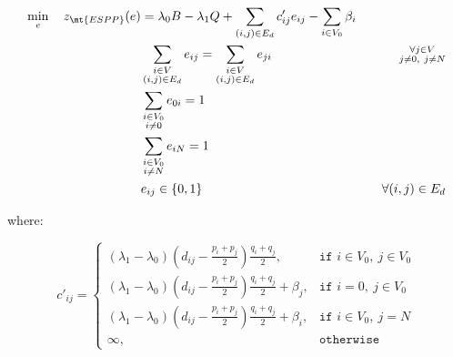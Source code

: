 \begin{align}
	\min_{e} \quad z_\mt{ESPP}(e) & = \lambda_0 B - \lambda_1 Q + \sum_{(i, j) \in E_d}  c'_{ij} e_{ij} - \sum_{i \in V_0} \beta_i  \label{eq:esp-relaxed-obj-function}                                                                                      \\
	                              & \sum_{\substack{i \in V                                                                                                                                                                                                  \\ (i, j) \in E_d}}       e_{ij}  = \sum_{\substack{i \in V \\ (i, j) \in E_d}} e_{ji}                                                       & \quad \substack{\forall j \in V                                             \\ j \ne 0,\ j \ne N}         \label{eq:esp-relaxed-flow-conservation-constraint-customers} \\
	                              & \sum_{\substack{i \in V_0                                                                                                                                                                                                \\ i \ne 0}} e_{0i} = 1 & \label{eq:espprc-flow-conservation-constraint-depot1} \\
	                              & \sum_{\substack{i \in V_0                                                                                                                                                                                                \\ i \ne N}} e_{iN} = 1 & \label{eq:esp-relaxed-flow-conservation-constraint-depot2} \\
	                              & e_{ij}                   \in \lbrace 0, 1 \rbrace                                                                                   & \quad \forall (i, j) \in E_d               \label{eq:esp-relaxed-e-mip-var-bounds} \\
\end{align}

where:

\begin{equation}
	c'_{ij} =
	\begin{cases}
		\left(\lambda_1 - \lambda_0 \right) \left( d_{ij} - \frac{p_i + p_j}{2} \right) \frac{q_i + q_j}{2},           & \texttt{if } i \in V_0,\ j \in V_0 \\
		\left(\lambda_1 - \lambda_0 \right) \left( d_{ij} - \frac{p_i + p_j}{2} \right) \frac{q_i + q_j}{2} + \beta_j, & \texttt{if } i = 0,\ j \in V_0     \\
		\left(\lambda_1 - \lambda_0 \right) \left( d_{ij} - \frac{p_i + p_j}{2} \right) \frac{q_i + q_j}{2} + \beta_i, & \texttt{if } i \in V_0,\ j = N     \\
		\infty,                                                                                                        & \texttt{otherwise}
	\end{cases}
\end{equation}

